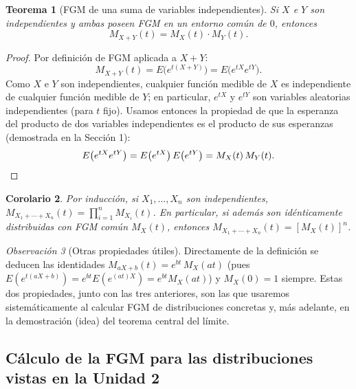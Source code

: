 \documentclass[11pt,a4paper]{article}
\theoremstyle{plain}
\newtheorem{teorema}{Teorema}[section]
\newtheorem{corolario}[teorema]{Corolario}
\theoremstyle{definition}
\theoremstyle{remark}
\newtheorem{observacion}[teorema]{Observación}
\begin{document}
\begin{teorema}[FGM de una suma de variables independientes]
Si $X$ e $Y$ son independientes y ambas poseen FGM en un entorno común de $0$, entonces
\[
M_{X+Y}(t) = M_X(t)\cdot M_Y(t).
\]
\end{teorema}

\begin{proof}
Por definición de FGM aplicada a $X+Y$:
\[
M_{X+Y}(t) = E\big(e^{t(X+Y)}\big) = E\big(e^{tX}e^{tY}\big).
\]
Como $X$ e $Y$ son independientes, cualquier función medible de $X$ es independiente de cualquier función medible de $Y$; en particular, $e^{tX}$ y $e^{tY}$ son variables aleatorias independientes (para $t$ fijo). Usamos entonces la propiedad de que la esperanza del producto de dos variables independientes es el producto de sus esperanzas (demostrada en la Sección 1):
\[
E\big(e^{tX}e^{tY}\big) = E\big(e^{tX}\big)\,E\big(e^{tY}\big) = M_X(t)\,M_Y(t). \qedhere
\]
\end{proof}

\begin{corolario}
Por inducción, si $X_1,\dots,X_n$ son independientes, $M_{X_1+\cdots+X_n}(t) = \prod_{i=1}^n M_{X_i}(t)$. En particular, si además son idénticamente distribuidas con FGM común $M_X(t)$, entonces $M_{X_1+\cdots+X_n}(t) = [M_X(t)]^n$.
\end{corolario}

\begin{observacion}[Otras propiedades útiles]
Directamente de la definición se deducen las identidades $M_{aX+b}(t) = e^{bt}\,M_X(at)$ (pues $E(e^{t(aX+b)})=e^{bt}E(e^{(at)X})=e^{bt}M_X(at)$) y $M_X(0)=1$ siempre. Estas dos propiedades, junto con las tres anteriores, son las que usaremos sistemáticamente al calcular FGM de distribuciones concretas y, más adelante, en la demostración (idea) del teorema central del límite.
\end{observacion}

\subsection{Cálculo de la FGM para las distribuciones vistas en la Unidad 2}
\end{document}
